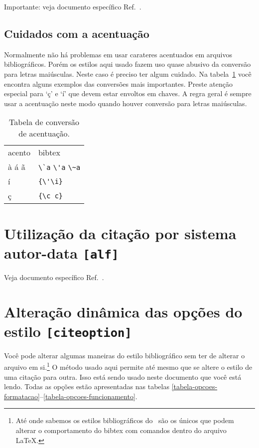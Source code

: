 \documentclass[espacosimples]{abnt}
\begin{document}
Importante: veja documento específico Ref.~.

\section{Cuidados com a acentuação}

Normalmente não há problemas em usar carateres acentuados em arquivos
bibliográficos. Porém os estilos aqui usado fazem uso quase abusivo da
conversão para letras maiúsculas. Neste caso é preciso ter algum cuidado.
Na tabela~\ref{tabela-acentos} você encontra alguns exemplos das conversões
mais importantes. Preste atenção especial para `ç' e `í' que devem estar
envoltos em chaves.
A regra geral é sempre usar a acentuação neste modo quando
houver conversão para letras maiúsculas.

\begin{table}[htbp]
\begin{center}
\begin{tabular}{ll}\hline\hline
acento & bibtex\\
à á ã & \verb+\`a+ \verb+\'a+ \verb+\~a+\\
í & \verb+{\'\i}+\\
ç & \verb+{\c c}+\\
\hline\hline
\end{tabular}
\end{center}
\caption{Tabela de conversão de acentuação.}
\label{tabela-acentos}
\end{table}


\chapter{Utilização da citação por sistema autor-data {\tt [alf]}}

Veja documento específico Ref.~.

\chapter{Alteração dinâmica das opções do estilo {\tt [citeoption]}}
\label{chapter-opcoes-estilo}
Você pode alterar algumas maneiras do estilo bibliográfico
sem ter de alterar o arquivo em si.\footnote{Até onde sabemos
os estilos bibliográficos do \abnTeX\ são os únicos que podem
alterar o comportamento do bibtex com comandos dentro do arquivo
\LaTeX.}
O método usado aqui permite até
mesmo que se altere o estilo de uma citação para outra.
Isso está sendo usado neste documento que você está lendo.
Todas as opções estão apresentadas nas tabelas \ref{tabela-opcoes-formatacao}--\ref{tabela-opcoes-funcionamento}.
\end{document}
